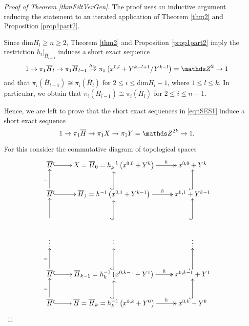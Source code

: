 \begin{proof}[Proof of Theorem \ref{thmFiltVerGen}]
 The proof uses an inductive argument reducing the statement to an iterated application of Theorem \ref{thm2} and Proposition \ref{prop1part2}.
 
Since $\mathrm{dim} H_l\geq n\geq 2$, Theorem \ref{thm2} and Proposition \ref{prop1part2} imply the restriction $h_l|_{\overline{H}_{l-1}}$ induces a short exact sequence
\begin{equation}
1\rightarrow \pi_1 \overline{H}_l \rightarrow \pi_1 \overline{H}_{l-1}\stackrel{h_{l\ast}}{\rightarrow} \pi_1 \left(x^{0,l}+ Y^{k-l+1}/Y^{k-l}\right) = \ZZ^2\rightarrow 1
\label{eqnSES1}
\end{equation}
and that $ \pi_i(\overline{H}_{l-1})\cong  \pi_ i(\overline{H}_l)$ for $2\leq i \leq \mathrm{dim} H_l-1$, where $1\leq l \leq k$. In particular, we obtain that $\pi_ i(\overline{H}_{l-1}) \cong \pi_i(\overline{H}_l)$ for $2\leq i \leq n-1$.
 
 Hence, we are left to prove that the short exact sequences in \eqref{eqnSES1} induce a short exact sequence
\[
1\rightarrow \pi_1 \overline{H} \rightarrow \pi_1 X\rightarrow \pi_1 Y=\ZZ^{2k}\rightarrow 1.
\]

For this consider the commutative diagram of topological spaces
\[
\xymatrix{
\overline{H} \ar@{^{(}->}[r] & X=\overline{H}_0=h_{k}^{-1}\left(x^{0,0}+ Y^k\right) \ar@{->>}[r] ^-{h} & x^{0,0}+ Y^k\\
\overline{H} \ar@{^{(}->}[r] \ar[u]^{=} & \overline{H}_1=h^{-1}\left(x^{0,1}+ Y^{k-1}\right) \ar@{->>}[r]^-{h} \ar@{^{(}->}[u] & x^{0,1}+ Y^{k-1} \ar@{^{(}->}[u] \\
  \ar[u]^{=} &  \ar@{^{(}->}[u] & \ar@{^{(}->}[u] \\
 \vdots & \vdots &\vdots \\
\overline{H} \ar@{^{(}->}[r] \ar[u]^{=} & \overline{H}_{k-1}=h_{k}^{-1}\left(x^{0,k-1}+ Y^1\right) \ar@{->>}[r]^-{h} \ar@{^{(}->}[u] & x^{0,k-1}+ Y^1 \ar@{^{(}->}[u] \\
\overline{H} \ar@{^{(}->}[r] \ar[u]^{=} & \overline{H}=\overline{H}_{k}=h_{k}^{-1}\left(x^{0,k}+ Y^0\right) \ar@{->>}[r]^-{h} \ar@{^{(}->}[u] & x^{0,k}+ Y^0 \ar@{^{(}->}[u] \\
} 
\]


\end{proof}
